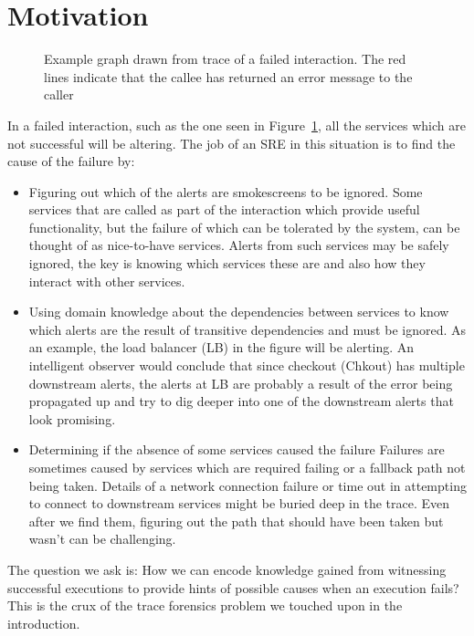 \section{Motivation}
\begin{figure}[h]
\caption{Example graph drawn from trace of a failed interaction. The red lines indicate that the callee has returned an error message to the caller}
\label{Failed_ex}
\end{figure}

In a failed interaction, such as the one seen in Figure~\ref{Failed_ex}, all the services which are not successful will be altering. The job of an SRE in this situation is to find the cause of the failure by:
\begin{itemize}
\item Figuring out which of the alerts are smokescreens to be ignored. \newline
Some services that are called as part of the interaction which provide useful functionality, but the failure of which can be tolerated by the system, can be thought of as nice-to-have services. Alerts from such services may be safely ignored, the key is knowing which services these are and also how they interact with other services. 
\item Using domain knowledge about the dependencies between services to know which alerts are the result of transitive dependencies and must be ignored. \newline
As an example, the load balancer (LB) in the figure will be alerting. An intelligent observer would conclude that since checkout (Chkout) has multiple downstream alerts, the alerts at LB are probably a result of the error being propagated up and try to dig deeper into one of the downstream alerts that look promising.
\item Determining if the absence of some services caused the failure \newline
Failures are sometimes caused by services which are required failing or a fallback path not being taken. Details of a network connection failure or time out in attempting to connect to downstream services might be buried deep in the trace. Even after we find them, figuring out the path that should have been taken but wasn't can be challenging. 
\end{itemize}
The question we ask is: How we can encode knowledge gained from witnessing successful executions to provide hints of possible causes when an execution fails? This is the crux of the trace forensics problem we touched upon in the introduction.
